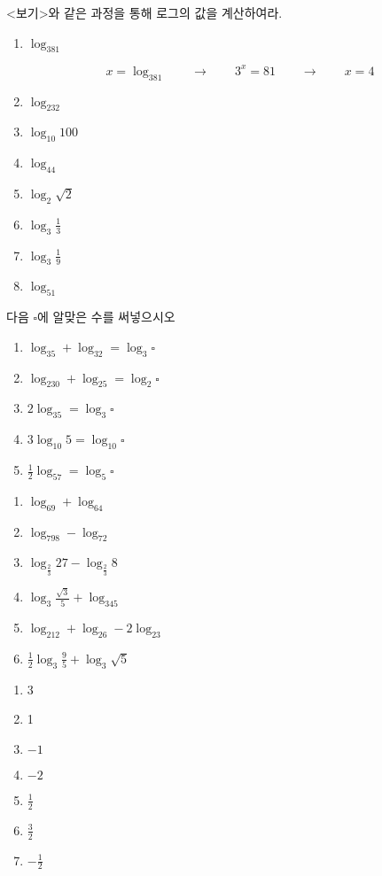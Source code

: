 \documentclass[a4paper]{oblivoir}
\begin{document}
%
\prob
<보기>와 같은 과정을 통해 로그의 값을 계산하여라.
\begin{enumerate}[(1)]
\item
\(\log_381\)
\begin{mdframed}[frametitle=<보기>]
\[x=\log_381\qquad\longrightarrow\qquad 3^x=81\qquad\longrightarrow\qquad x=4\]
\end{mdframed}
\item
\(\log_232\)
\item
\(\log_{10}100\)
\item
\(\log_44\)
\item
\(\log_2\sqrt2\)
\item
\(\log_3\frac13\)
\item
\(\log_3\frac19\)
\item
\(\log_51\)
\end{enumerate}

%
\prob
다음 \(\square\)에 알맞은 수를 써넣으시오
\begin{enumerate}[(1)]
\item
\(\log_35+\log_32=\log_3\square\)
\item
\(\log_230+\log_25=\log_2\square\)
\item
\(2\log_35=\log_3\square\)
\item
\(3\log_{10}5=\log_{10}\square\)
\item
\(\frac12\log_57=\log_5\square\)
\end{enumerate}

%
\begin{enumerate}[(1)]
\item
\(\log_69+\log_64\)
\item
\(\log_798-\log_72\)
\item
\(\log_{\frac23}27-\log_{\frac23}8\)
\item
\(\log_3{\frac{\sqrt3}5}+\log_345\)
\item
\(\log_212+\log_26-2\log_23\)
\item
\(\frac12\log_3\frac95+\log_3\sqrt5\)
\end{enumerate}


\newpage
\setcounter{num}{0}

%
\ans
\begin{enumerate}[(1)]
\item
3
\item
1
\item
\(-1\)
\item
\(-2\)
\item
\(\frac12\)
\item
\(\frac32\)
\item
\(-\frac12\)
\end{enumerate}
\end{document}
